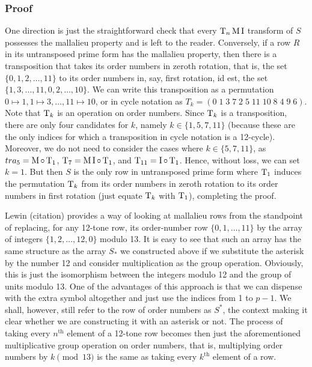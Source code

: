\subsubsection{Proof}

One direction is just the straightforward check that every $\operatorname{T}_n\operatorname{M}\operatorname{I}$ transform of $S$ possesses the mallalieu property and is left to the reader. Conversely, if a row $R$ in its untransposed prime form has the mallalieu property, then there is a transposition that takes its order numbers in zeroth rotation, that is, the set $\{ 0, 1, 2, \dots, 11 \}$ to its order numbers in, say, first rotation, id est, the set $\{ 1, 3, \dots, 11, 0, 2, \dots, 10 \}$. We can write this transposition as a permutation $0 \mapsto 1, 1 \mapsto 3, \dots, 11 \mapsto 10 $, or in cycle notation as $T_k = ( 0 \; 1 \; 3 \; 7 \; 2 \; 5 \; 11 \; 10 \; 8 \; 4 \; 9 \; 6 )$. Note that $\operatorname{T}_k$ is an operation on order numbers. Since $\operatorname{T}_k$ is a transposition, there are only four candidates for $k$, namely $k \in \{ 1, 5, 7, 11 \}$ (because these are the only indices for which a transposition in cycle notation is a 12-cycle). Moreover, we do not need to consider the cases where $k \in \{5, 7, 11\}$, as $tra_5 = \operatorname{M} \circ \operatorname{T}_1$, $\operatorname{T}_7 = \operatorname{M}\operatorname{I} \circ \operatorname{T}_1$, and $\operatorname{T}_{11} = \operatorname{I} \circ \operatorname{T}_1$. Hence, without loss, we can set $k = 1$. But then $S$ is the only row in untransposed prime form where $\operatorname{T}_1$ induces the permutation $\operatorname{T}_k$ from its order numbers in zeroth rotation to its order numbers in first rotation (just equate $\operatorname{T}_k$ with $\operatorname{T}_1$), completing the proof.

Lewin (citation) provides a way of looking at mallalieu rows from the standpoint of replacing, for any 12-tone row, its order-number row $\{ 0, 1, \dots, 11 \}$ by the array of integers $\{ 1, 2, \dots, 12, 0 \}$ modulo 13. It is easy to see that such an array has the same structure as the array $S_*$ we constructed above if we substitute the asterisk by the number 12 and consider multiplication as the group operation. Obviously, this is just the isomorphism between the integers modulo 12 and the group of units modulo 13. One of the advantages of this approach is that we can dispense with the extra symbol altogether and just use the indices from 1 to $p - 1$. We shall, however, still refer to the row of order numbers as $S^*$, the context making it clear whether we are constructing it with an asterisk or not. The process of taking every $n^\text{th}$ element of a 12-tone row becomes then just the aforementioned multiplicative group operation on order numbers, that is, multiplying order numbers by $k \pmod{13}$ is the same as taking every $k^\text{th}$ element of a row.

